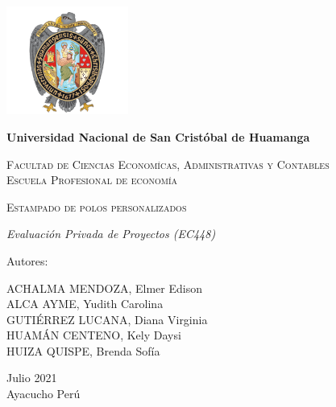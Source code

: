 \documentclass[a4paper,openright,12pt]{book}
\begin{document}




\begin{titlepage}
     \centering
     {\includegraphics[width=0.3\textwidth]{Figuras/Logo.png}\par}
     \vspace{0.5cm}
     {\bfseries\LARGE Universidad Nacional de San Crist\'obal de Huamanga\par}
     \vspace{0.5cm}
     {\scshape\Large Facultad de Ciencias Econom\'icas, Administrativas y Contables\\Escuela Profesional de economía\par}
     \vspace{1cm}
     {\scshape\Huge Estampado de polos personalizados \par}
     \vspace{0.3cm}
     {\itshape\Large Evaluación Privada de Proyectos (EC448) \par}
     \vfill
     {\Large Autores: \par}
     \begin{flushleft}
     {\Large ACHALMA MENDOZA, Elmer Edison\\ ALCA AYME, Yudith Carolina\\GUTIÉRREZ LUCANA, Diana Virginia\\ HUAMÁN CENTENO, Kely Daysi\\ HUIZA QUISPE, Brenda Sofía\par}
     \end{flushleft}
     \vfill
     \vspace{1cm}
     {\Large Julio 2021\\ Ayacucho Perú \par}
\end{titlepage}

\newpage
$\ $
\thispagestyle{empty} %
\end{document}
